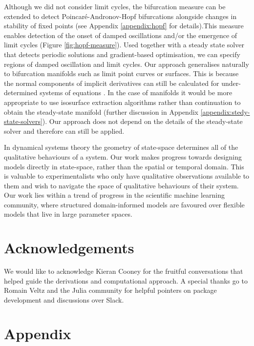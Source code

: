 \documentclass{article}
\begin{document}
Although we did not consider limit cycles, the bifurcation measure can be extended to detect Poincar\'e-Andronov-Hopf bifurcations alongside changes in stability of fixed points (see Appendix \ref{appendix:hopf} for details).This measure enables detection of the onset of damped oscillations and/or the emergence of limit cycles (Figure \ref{fig:hopf-measure}). Used together with a steady state solver that detects periodic solutions and gradient-based optimisation, we can specify regions of damped oscillation and limit cycles. Our approach generalises naturally to bifurcation manifolds such as limit point curves or surfaces. This is because the normal components of implicit derivatives can still be calculated for under-determined systems of equations \cite{Jos2011OnSurface,Tao2016Near-IsometricTracking,Fujisawa2013CalculationInvariance}. In the case of manifolds it would be more appropriate to use isosurface extraction algorithms rather than continuation to obtain the steady-state manifold (further discussion in Appendix \ref{appendix:stedy-state-solvers}). Our approach does not depend on the details of the steady-state solver and therefore can still be applied.

In dynamical systems theory the geometry of state-space determines all of the qualitative behaviours of a system. Our work makes progress towards designing models directly in state-space, rather than the spatial or temporal domain. This is valuable to experimentalists who only have qualitative observations available to them and wish to navigate the space of qualitative behaviours of their system. Our work lies within a trend of progress in the scientific machine learning community, where structured domain-informed models are favoured over flexible models that live in large parameter spaces.

\section{Acknowledgements}
We would like to acknowledge Kieran Cooney for the fruitful conversations that helped guide the derivations and computational approach. A special thanks go to Romain Veltz and the Julia community for helpful pointers on package development and discussions over Slack.




\clearpage{}\setcounter{page}{1}
\section*{Appendix}
\appendix

\end{document}
